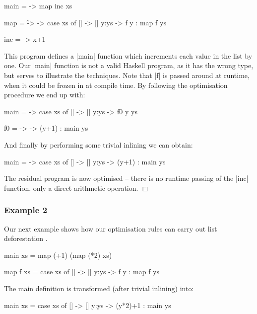 \documentclass{llncs}
\newcommand{\noexample}{\hfill$\Box$}
\begin{document}
\begin{code}
main = \xs -> map inc xs

map = \f -> \xs -> case  xs of
                         []    -> []
                         y:ys  -> f y : map f ys

inc = \x -> x+1
\end{code}

This program defines a |main| function which increments each value in the list by one. Our |main| function is not a valid Haskell program, as it has the wrong type, but serves to illustrate the techniques. Note that |f| is passed around at runtime, when it could be frozen in at compile time. By following the optimisation procedure we end up with:

\begin{code}
main = \xs -> case  xs of
                    []    -> []
                    y:ys  -> f0 y ys

f0 = \y -> \ys -> (y+1) : main ys
\end{code}

And finally by performing some trivial inlining we can obtain:

\begin{code}
main = \xs -> case  xs of
                    []    -> []
                    y:ys  -> (y+1) : main ys
\end{code}

The residual program is now optimised -- there is no runtime passing of the |inc| function, only a direct arithmetic operation. \noexample

\subsubsection{Example 2} \hfill \vspace{2mm}

\noindent Our next example shows how our optimisation rules can carry out list deforestation \cite{wadler:deforestation}.

\begin{code}
main xs = map (+1) (map (*2) xs)

map f xs = case  xs of
                 []    -> []
                 y:ys  -> f y : map f ys
\end{code}

The main definition is transformed (after trivial inlining) into:

\begin{code}
main xs = case  xs of
                []    -> []
                y:ys  -> (y*2)+1 : main ys
\end{code}
\end{document}
